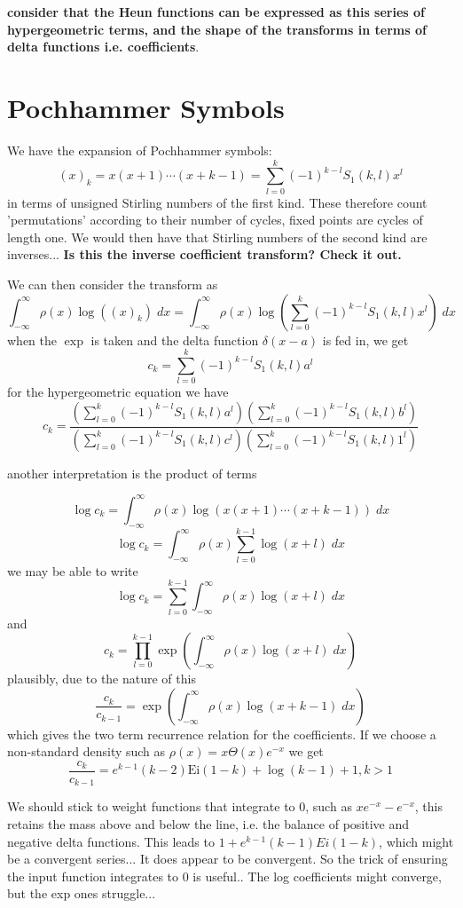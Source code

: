 \documentclass{article}
\begin{document}
\textbf{consider that the Heun functions can be expressed as this series of hypergeometric terms, and the shape of the transforms in terms of delta functions i.e. coefficients}.

\section{Pochhammer Symbols}
We have the expansion of Pochhammer symbols:
$$
(x)_k = x(x+1) \cdots (x+k-1) = \sum_{l=0}^k (-1)^{k-l} S_1(k,l) x^l
$$
in terms of unsigned Stirling numbers of the first kind. These therefore count 'permutations' according to their number of cycles, fixed points are cycles of length one. We would then have that Stirling numbers of the second kind are inverses... \textbf{Is this the inverse coefficient transform? Check it out.}

We can then consider the transform as 
$$
\int_{-\infty} ^ \infty \rho(x) \log((x)_k) \; dx = \int_{-\infty} ^ \infty \rho(x) \log(\sum_{l=0}^k (-1)^{k-l} S_1(k,l) x^l) \; dx 
$$
when the $\exp$ is taken and the delta function $\delta(x-a)$ is fed in, we get 
$$
c_k = \sum_{l=0}^k (-1)^{k-l} S_1(k,l) a^l
$$
for the hypergeometric equation we have
$$
c_k = \frac{\left(\sum_{l=0}^k (-1)^{k-l} S_1(k,l) a^l\right)\left(\sum_{l=0}^k (-1)^{k-l} S_1(k,l) b^l\right)}{\left(\sum_{l=0}^k (-1)^{k-l} S_1(k,l) c^l\right)\left(\sum_{l=0}^k (-1)^{k-l} S_1(k,l) 1^l\right)}
$$

another interpretation is the product of terms 

$$\log c_k = \int_{-\infty} ^ \infty \rho(x) \log(x(x+1)\cdots(x+k-1)) \; dx 
$$
$$
\log c_k = \int_{-\infty} ^ \infty \rho(x) \sum_{l=0}^{k-1}\log(x+l) \; dx 
$$
we may be able to write
$$
\log c_k = \sum_{l=0}^{k-1} \int_{-\infty} ^ \infty \rho(x) \log(x+l) \; dx 
$$
and
$$
c_k = \prod_{l=0}^{k-1} \exp\left( \int_{-\infty} ^ \infty \rho(x) \log(x+l) \; dx  \right)
$$
plausibly, due to the nature of this
$$
\frac{c_k}{c_{k-1}} = \exp\left( \int_{-\infty} ^ \infty \rho(x) \log(x+k-1) \; dx  \right)
$$
which gives the two term recurrence relation for the coefficients. If we choose a non-standard density such as $\rho(x) = x \Theta(x)e^{-x}$ we get 
$$
\frac{c_k}{c_{k-1}} = e^{k-1} (k-2) \text{Ei}(1-k)+\log (k-1)+1, k>1
$$

We should stick to weight functions that integrate to $0$, such as $x e^{-x} - e^{-x}$, this retains the mass above and below the line, i.e. the balance of positive and negative delta functions. This leads to $1+ e^{k-1}(k-1)Ei(1-k)$, which might be a convergent series... It does appear to be convergent. So the trick of ensuring the input function integrates to $0$ is useful.. The log coefficients might converge, but the exp ones struggle... 
\end{document}

